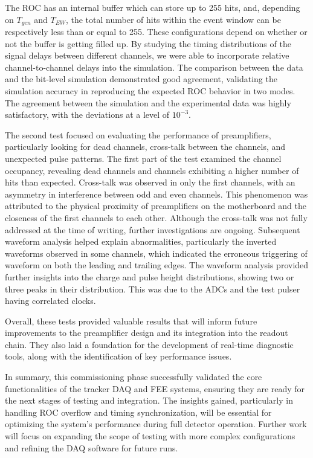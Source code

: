 The ROC has an internal buffer which can store up to 255 hits, 
and, depending on \( T_{gen} \) and \( T_{EW} \), 
the total number of hits within the event window 
can be respectively less than or equal to 255. 
These configurations depend on whether or not the buffer 
is getting filled up.
By studying the timing distributions of the signal delays 
between different channels, we 
were able to incorporate relative channel-to-channel delays into 
the simulation. The comparison 
between the data and the bit-level simulation 
demonstrated good agreement, 
validating the simulation accuracy in reproducing 
the expected ROC behavior in   
two modes. The agreement between 
the simulation and the experimental data was highly satisfactory,
with the deviations at a level of \( 10^{-3} \).

The second test focused on evaluating the 
performance of preamplifiers, 
particularly looking for dead channels, 
cross-talk between the channels, 
and unexpected pulse patterns. The first part 
of the test examined the channel occupancy, revealing 
dead channels and channels exhibiting a higher 
number of hits than expected. 
Cross-talk was observed in only the first channels, 
with an asymmetry in interference 
between odd and even channels. This phenomenon was 
attributed to the physical proximity 
of preamplifiers on the motherboard and the 
closeness of the first channels to each other. 
Although the cross-talk was not fully addressed at 
the time of writing, further investigations 
are ongoing. Subsequent waveform analysis helped explain 
abnormalities, particularly the inverted 
waveforms observed in some channels, which indicated 
the erroneous triggering of waveform 
on both the leading and trailing edges. The 
waveform analysis 
provided further insights into the charge and 
pulse height distributions, showing two or 
three peaks in their distribution. This was due 
to the ADCs and the test pulser having 
correlated clocks. 

Overall, these tests provided valuable results 
that will inform future improvements to the 
preamplifier design and its integration into 
the readout chain. They also laid a foundation  
for the development of real-time 
diagnostic tools, along with the identification of 
key performance issues.

In summary, this commissioning phase successfully validated 
the core functionalities 
of the tracker DAQ and FEE systems, ensuring they are ready 
for the next stages of 
testing and integration. The insights gained, particularly 
in handling ROC overflow 
and timing synchronization, will be essential for optimizing 
the system's performance 
during full detector operation. Further work will focus on 
expanding the scope of 
testing with more complex configurations and refining the 
DAQ software for future runs.


